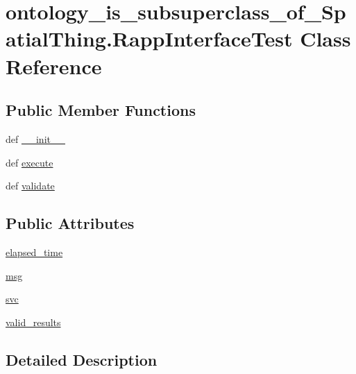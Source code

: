 \hypertarget{classontology__is__subsuperclass__of__SpatialThing_1_1RappInterfaceTest}{\section{ontology\-\_\-is\-\_\-subsuperclass\-\_\-of\-\_\-\-Spatial\-Thing.\-Rapp\-Interface\-Test Class Reference}
\label{classontology__is__subsuperclass__of__SpatialThing_1_1RappInterfaceTest}
}
\subsection*{Public Member Functions}
\begin{DoxyCompactItemize}
\item 
def \hyperlink{classontology__is__subsuperclass__of__SpatialThing_1_1RappInterfaceTest_af9fd3ea64f1917f36d092faf5dc59219}{\-\_\-\-\_\-init\-\_\-\-\_\-}
\item 
def \hyperlink{classontology__is__subsuperclass__of__SpatialThing_1_1RappInterfaceTest_ae5d8694e1d9e52573f592dbe5dbf783c}{execute}
\item 
def \hyperlink{classontology__is__subsuperclass__of__SpatialThing_1_1RappInterfaceTest_a86c99e1377e9435c784add863387ec7b}{validate}
\end{DoxyCompactItemize}
\subsection*{Public Attributes}
\begin{DoxyCompactItemize}
\item 
\hyperlink{classontology__is__subsuperclass__of__SpatialThing_1_1RappInterfaceTest_a87712c4780d995f0dbb6fdc07e5f8d5a}{elapsed\-\_\-time}
\item 
\hyperlink{classontology__is__subsuperclass__of__SpatialThing_1_1RappInterfaceTest_a4ee6739b24c892e2938f585ad51b5184}{msg}
\item 
\hyperlink{classontology__is__subsuperclass__of__SpatialThing_1_1RappInterfaceTest_a3138eef0f79111c48ea53ac8ff24bb5a}{svc}
\item 
\hyperlink{classontology__is__subsuperclass__of__SpatialThing_1_1RappInterfaceTest_a6643a11c2835d7d6e72acf58b9ead5f7}{valid\-\_\-results}
\end{DoxyCompactItemize}


\subsection{Detailed Description}


